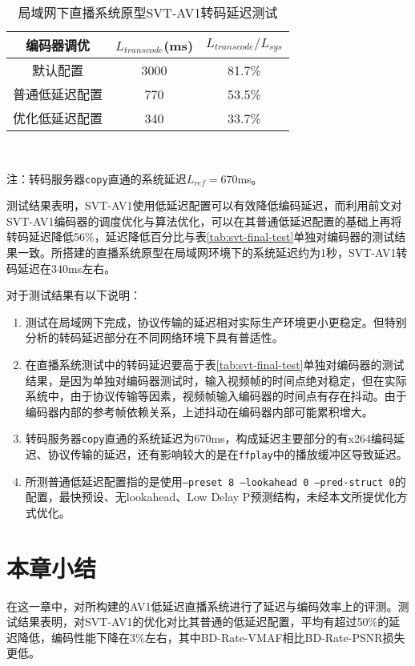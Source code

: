   \begin{table}[htbp]
		\caption{局域网下直播系统原型SVT-AV1转码延迟测试}
		\label{tab:sys-lat}
		\centering
		\begin{tabular}{ccc}
			\toprule
			 编码器调优  & $L_{transcode}$(ms) & $L_{transcode}/L_{sys}$ \\ \midrule
			 默认配置   &        3000         &         81.7\%          \\
			普通低延迟配置 &         770         &         53.5\%          \\
			优化低延迟配置 &         340         &         33.7\%          \\ \bottomrule
		\end{tabular}\\ \raggedright \vspace{8pt} \qquad \qquad \qquad \qquad
	\small 注：转码服务器\texttt{copy}直通的系统延迟$L_{ref}=670$ms。
	\end{table}

  测试结果表明，SVT-AV1使用低延迟配置可以有效降低编码延迟，而利用前文对SVT-AV1编码器的调度优化与算法优化，可以在其普通低延迟配置的基础上再将转码延迟降低56\%，延迟降低百分比与表\ref{tab:svt-final-test}单独对编码器的测试结果一致。所搭建的直播系统原型在局域网环境下的系统延迟约为1秒，SVT-AV1转码延迟在340ms左右。

  对于测试结果有以下说明：
  \begin{enumerate}[label=\arabic*)]
  	\item 测试在局域网下完成，协议传输的延迟相对实际生产环境更小更稳定。但特别分析的转码延迟部分在不同网络环境下具有普适性。
  	\item 在直播系统测试中的转码延迟要高于表\ref{tab:svt-final-test}单独对编码器的测试结果，是因为单独对编码器测试时，输入视频帧的时间点绝对稳定，但在实际系统中，由于协议传输等因素，视频帧输入编码器的时间点有存在抖动。由于编码器内部的参考帧依赖关系，上述抖动在编码器内部可能累积增大。
  	\item 转码服务器\texttt{copy}直通的系统延迟为670ms，构成延迟主要部分的有x264编码延迟、协议传输的延迟，还有影响较大的是在\texttt{ffplay}中的播放缓冲区导致延迟。
  	\item 所测普通低延迟配置指的是使用\texttt{--preset 8 --lookahead 0 --pred-struct 0}的配置，最快预设、无lookahead、Low Delay P预测结构，未经本文所提优化方式优化。
  \end{enumerate}

\section{本章小结}
在这一章中，对所构建的AV1低延迟直播系统进行了延迟与编码效率上的评测。测试结果表明，对SVT-AV1的优化对比其普通的低延迟配置，平均有超过50\%的延迟降低，编码性能下降在3\%左右，其中BD-Rate-VMAF相比BD-Rate-PSNR损失更低。

